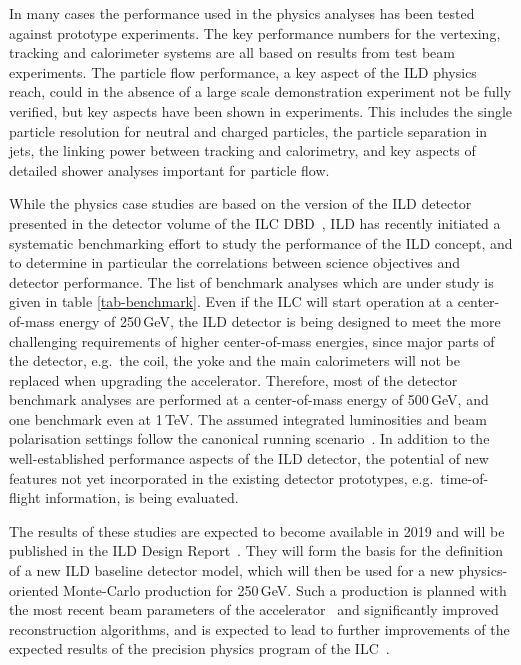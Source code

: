 \documentclass[%
 amsmath,amssymb,
 aps,
 longbibliography,
]{revtex4-1}
\begin{document}
In many cases the performance used in the physics analyses has been tested against prototype experiments. The key performance numbers for the vertexing, tracking and calorimeter systems are all based on results from test beam experiments. The particle flow performance, a key aspect of the ILD physics reach, could in the absence of a large scale demonstration experiment not be fully verified, but key aspects have been shown in experiments. This includes the single particle resolution for neutral and charged particles, the particle separation in jets, the linking power between tracking and calorimetry, and key aspects of detailed shower analyses important for particle flow. 

While the physics case studies are based on the version of the ILD detector presented in the detector volume of the ILC DBD~\cite{ild-dbd}, ILD has recently initiated a systematic benchmarking effort to study the performance of the ILD concept, and to determine in particular the correlations between science objectives and detector performance. The list of benchmark analyses which are under study is given in table \ref{tab-benchmark}. Even if the ILC will start operation at a center-of-mass energy of 250\,GeV, the ILD detector is being designed to meet the more challenging requirements of higher center-of-mass energies, since major parts of the detector, e.g.\ the coil, the yoke and the main calorimeters will not be replaced when upgrading the accelerator. Therefore, most of the detector benchmark analyses are performed at a center-of-mass energy of 500\,GeV, and one benchmark even at 1\,TeV. The assumed integrated luminosities and beam polarisation settings follow the canonical running scenario~\cite{Barklow:2015tja}. 
In addition to the well-established performance aspects of the ILD detector, the potential of new features not yet incorporated in the existing detector prototypes, e.g.\ time-of-flight information, is being evaluated. 

The results of these studies are expected to become available in 2019 and will be published in the ILD Design Report~\cite{fwdrefIDR}. They will form the basis for the definition of a new ILD baseline detector model, which will then be used for a new physics-oriented Monte-Carlo production for 250\,GeV. Such a production is planned with the most recent beam parameters of the accelerator~\cite{Evans:2017rvt} and significantly improved reconstruction algorithms, and is expected to lead to further improvements of the expected results of the precision physics program of the ILC~\cite{ILCESU1}.
\end{document}
